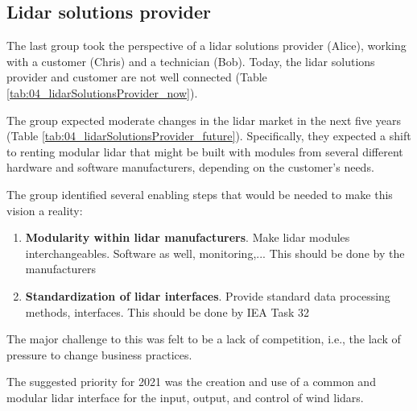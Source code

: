 \subsection{Lidar solutions provider}
The last group took the perspective of a lidar solutions provider (Alice), working with a customer (Chris) and a technician (Bob). Today, the lidar solutions provider and customer are not well connected (Table \ref{tab:04_lidarSolutionsProvider_now}).

The group expected moderate changes in the lidar market in the next five years (Table \ref{tab:04_lidarSolutionsProvider_future}). Specifically, they expected a shift to renting modular lidar that might be built with modules from several different hardware and software manufacturers, depending on the customer's needs.

The group identified several enabling steps that would be needed to make
this vision a reality:

\begin{enumerate}
\item
  \textbf{Modularity within lidar manufacturers}. Make lidar modules
  interchangeables. Software as well, monitoring,... This should be done
  by the manufacturers
\item
  \textbf{Standardization of lidar interfaces}. Provide standard data
  processing methods, interfaces. This should be done by IEA Task 32
\end{enumerate}

The major challenge to this was felt to be a lack of competition, i.e., the lack of pressure to change business practices.

The suggested priority for 2021 was the creation and use of a common and modular lidar interface for the input, output, and control of wind lidars.
